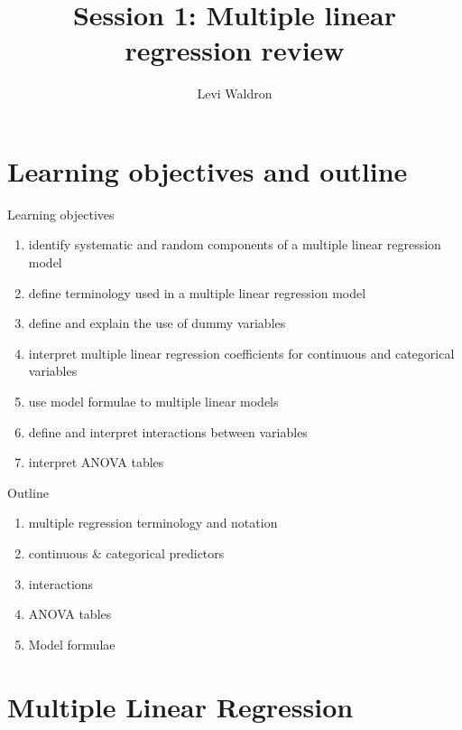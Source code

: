 \documentclass[
  ignorenonframetext,
]{beamer}
\title{Session 1: Multiple linear regression review}
\author{Levi Waldron}
\date{}
\institute{CUNY SPH Biostatistics 2}
\providecommand{\tightlist}{%
  \setlength{\itemsep}{0pt}\setlength{\parskip}{0pt}}
\begin{document}
\frame{\titlepage}

\hypertarget{learning-objectives-and-outline}{%
\section{Learning objectives and
outline}\label{learning-objectives-and-outline}}

\begin{frame}{Learning objectives}
\protect\hypertarget{learning-objectives}{}

\begin{enumerate}
\tightlist
\item
  identify systematic and random components of a multiple linear
  regression model
\item
  define terminology used in a multiple linear regression model
\item
  define and explain the use of dummy variables
\item
  interpret multiple linear regression coefficients for continuous and
  categorical variables
\item
  use model formulae to multiple linear models
\item
  define and interpret interactions between variables
\item
  interpret ANOVA tables
\end{enumerate}

\end{frame}

\begin{frame}{Outline}
\protect\hypertarget{outline}{}

\begin{enumerate}
\tightlist
\item
  multiple regression terminology and notation
\item
  continuous \& categorical predictors
\item
  interactions
\item
  ANOVA tables
\item
  Model formulae
\end{enumerate}

\end{frame}

\hypertarget{multiple-linear-regression}{%
\section{Multiple Linear Regression}\label{multiple-linear-regression}}
\end{document}
